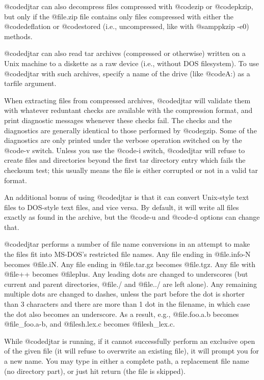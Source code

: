 @code{djtar} can also decompress files compressed with @code{zip} or
@code{pkzip}, but only if the @file{.zip} file contains only files
compressed with either the @code{deflation} or @code{stored} (i.e.,
uncompressed, like with @samp{pkzip -e0}) methods.

@code{djtar} can also read tar archives (compressed or otherwise) written
on a Unix machine to a diskette as a raw device (i.e., without DOS
filesystem).  To use @code{djtar} with such archives, specify a name
of the drive (like @code{A:}) as a tarfile argument.

When extracting files from compressed archives, @code{djtar} will
validate them with whatever reduntant checks are available with the
compression format, and print diagnostic messages whenever these checks
fail.  The checks and the diagnostics are generally identical to those
performed by @code{gzip}.  Some of the diagnostics are only printed under
the verbose operation switched on by the @code{-v} switch.  Unless you use
the @code{-i} switch, @code{djtar} will refuse to create files and
directories beyond the first tar directory entry which fails the checksum
test; this usually means the file is either corrupted or not in a valid
tar format.

An additional bonus of using @code{djtar} is that it can convert
Unix-style text files to DOS-style text files, and vice versa.  By
default, it will write all files exactly as found in the archive, but the
@code{-u} and @code{-d} options can change that.

@code{djtar} performs a number of file name conversions in an attempt
to make the files fit into MS-DOS's restricted file names.  Any file
ending in @file{.info-N} becomes @file{.iN}.  Any file ending in
@file{.tar.gz} becomes @file{.tgz}.  Any file with @file{++} becomes
@file{plus}.  Any leading dots are changed to underscores (but current
and parent directories, @file{./} and @file{../} are left alone).  Any
remaining multiple dots are changed to dashes, unless the part before the
dot is shorter than 3 characters and there are more than 1 dot in the
filename, in which case the dot also becomes an underscore.  As a result,
e.g., @file{.foo.a.b} becomes @file{_foo.a-b}, and @file{sh.lex.c} becomes
@file{sh_lex.c}.

While @code{djtar} is running, if it cannot successfully perform an
exclusive open of the given file (it will refuse to overwrite an
existing file), it will prompt you for a new name.  You may type in
either a complete path, a replacement file name (no directory part), or
just hit return (the file is skipped).

